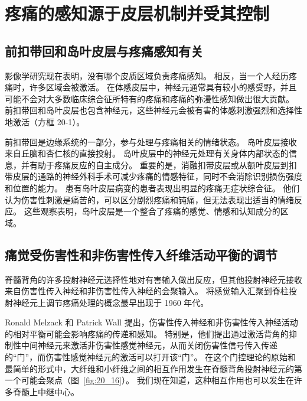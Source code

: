 \section{疼痛的感知源于皮层机制并受其控制}

\subsection{前扣带回和岛叶皮层与疼痛感知有关}

影像学研究现在表明，没有哪个皮质区域负责疼痛感知。 
相反，当一个人经历疼痛时，许多区域会被激活。
在体感皮层中，神经元通常具有较小的感受野，并且可能不会对大多数临床综合征所特有的疼痛和疼痛的弥漫性感知做出很大贡献。
前扣带回和岛叶皮层也包含神经元，这些神经元会被有害的体感刺激强烈和选择性地激活（方框 20-1）。


前扣带回是边缘系统的一部分，参与处理与疼痛相关的情绪状态。
岛叶皮层接收来自丘脑和杏仁核的直接投射。
岛叶皮层中的神经元处理有关身体内部状态的信息，并有助于疼痛反应的自主成分。
重要的是，消融扣带皮层或从额叶皮层到扣带皮层的通路的神经外科手术可减少疼痛的情感特征，同时不会消除识别损伤强度和位置的能力。
患有岛叶皮层病变的患者表现出明显的疼痛无症状综合征。
他们认为伤害性刺激是痛苦的，可以区分剧烈疼痛和钝痛，但无法表现出适当的情绪反应。
这些观察表明，岛叶皮层是一个整合了疼痛的感觉、情感和认知成分的区域。



\subsection{痛觉受伤害性和非伤害性传入纤维活动平衡的调节}

脊髓背角的许多投射神经元选择性地对有害输入做出反应，但其他投射神经元接收来自伤害性传入神经和非伤害性传入神经的会聚输入。
将感觉输入汇聚到脊柱投射神经元上调节疼痛处理的概念最早出现于 1960 年代。


Ronald Melzack 和 Patrick Wall 提出，伤害性传入神经和非伤害性传入神经活动的相对平衡可能会影响疼痛的传递和感知。
特别是，他们提出通过激活背角的抑制性中间神经元来激活非伤害性感觉神经元，从而关闭伤害性信号传入传递的“门”，而伤害性感觉神经元的激活可以打开该“门”。 
在这个门控理论的原始和最简单的形式中，大纤维和小纤维之间的相互作用发生在脊髓背角投射神经元的第一个可能会聚点（图~\ref{fig:20_16}）。
我们现在知道，这种相互作用也可以发生在许多脊髓上中继中心。


